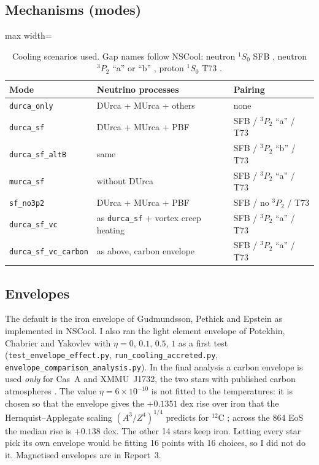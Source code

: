\documentclass[11pt,a4paper]{article}
\begin{document}
\subsection{Mechanisms (modes)}
\begin{table}[h]
\centering
\small
\caption{Cooling scenarios used. Gap names follow NSCool: neutron $^1S_0$ SFB \cite{SFB2003}, neutron $^3P_2$ ``a'' or ``b'' \cite{Page2004}, proton $^1S_0$ T73 \cite{Takatsuka1973}.}\label{tab:modes}
\begin{adjustbox}{max width=\linewidth}
\begin{tabular}{lll}
\toprule
Mode & Neutrino processes & Pairing\\
\midrule
\texttt{durca\_only} & DUrca + MUrca + others & none\\
\texttt{durca\_sf} & DUrca + MUrca + PBF & SFB / $^3P_2$ ``a'' / T73\\
\texttt{durca\_sf\_altB} & same & SFB / $^3P_2$ ``b'' / T73\\
\texttt{murca\_sf} & without DUrca & SFB / $^3P_2$ ``a'' / T73\\
\texttt{sf\_no3p2} & DUrca + MUrca + PBF & SFB / no $^3P_2$ / T73\\
\texttt{durca\_sf\_vc} & as \texttt{durca\_sf} + vortex creep heating & SFB / $^3P_2$ ``a'' / T73\\
\texttt{durca\_sf\_vc\_carbon} & as above, carbon envelope & SFB / $^3P_2$ ``a'' / T73\\
\bottomrule
\end{tabular}
\end{adjustbox}
\end{table}

\subsection{Envelopes}
The default is the iron envelope of Gudmundsson, Pethick and Epstein \cite{GPE1983} as implemented in NSCool. I also ran the light element envelope of Potekhin, Chabrier and Yakovlev \cite{PCY1997} with $\eta=0,\,0.1,\,0.5,\,1$ as a first test (\texttt{test\_envelope\_effect.py}, \texttt{run\_cooling\_accreted.py}, \texttt{envelope\_comparison\_analysis.py}). In the final analysis a carbon envelope is used \emph{only} for Cas~A and XMMU~J1732, the two stars with published carbon atmospheres \cite{HoHeinke2009,Klochkov2013}. The value $\eta=6\times10^{-10}$ is not fitted to the temperatures: it is chosen so that the envelope gives the $+0.1351$ dex rise over iron that the Hernquist--Applegate scaling $(A^3/Z^4)^{1/4}$ predicts for $^{12}$C \cite{HernquistApplegate1984}; across the 864 EoS the median rise is $+0.138$ dex. The other 14 stars keep iron. Letting every star pick its own envelope would be fitting 16 points with 16 choices, so I did not do it. Magnetised envelopes are in Report~3.
\end{document}
